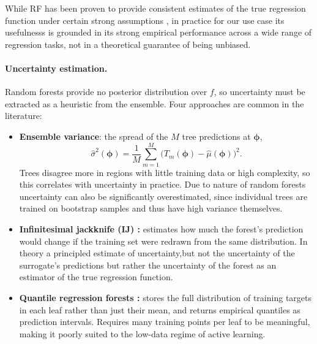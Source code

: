 While RF has been proven to provide consistent estimates of the true regression function under certain strong assumptions , in practice for our use case its usefulnesss is grounded in its strong empirical performance across a wide range of regression tasks, not in a theoretical guarantee of being unbiased.

\paragraph{Uncertainty estimation.}
Random forests provide no posterior distribution over $f$, so uncertainty must be extracted as a heuristic from the ensemble. Four approaches are common in the literature:

\begin{itemize}
  \item \textbf{Ensemble variance}: the spread of the $M$ tree predictions at $\boldsymbol{\phi}$,
    \begin{equation}
      \hat{\sigma}^2(\boldsymbol{\phi}) = \frac{1}{M}\sum_{m=1}^{M}\bigl(T_m(\boldsymbol{\phi}) - \hat{\mu}(\boldsymbol{\phi})\bigr)^2.
    \end{equation}
    Trees disagree more in regions with little training data or high complexity, so this correlates with uncertainty in practice. Due to nature of random forests uncertainty can also be significantly overestimated, since individual trees are trained on bootstrap samples and thus have high variance themselves.

  \item \textbf{Infinitesimal jackknife (IJ) :} estimates how much the forest's prediction would change if the training set were redrawn from the same distribution. In theory a principled estimate of uncertainty,but not the uncertainty of the surrogate's predictions but rather the uncertainty of the forest as an estimator of the true regression function. 

  \item \textbf{Quantile regression forests :} stores the full distribution of training targets in each leaf rather than just their mean, and returns empirical quantiles as prediction intervals. Requires many training points per leaf to be meaningful, making it poorly suited to the low-data regime of active learning.


\end{itemize}
